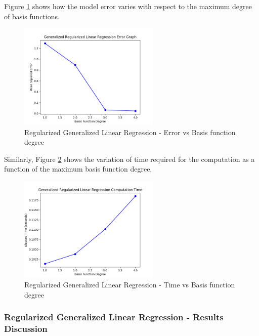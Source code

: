 \documentclass[parskip=full]{scrartcl}
\begin{document}
        Figure \ref{fig:rglg_err_v_deg} shows how the model error varies with respect to the maximum degree of basis functions. 

        \begin{figure}[ht]
            \centering
            \includegraphics[width=0.6\textwidth]{3a_degree_vs_error.png}
            \caption{Regularized Generalized Linear Regression - Error vs Basis function degree}
            \label{fig:rglg_err_v_deg}
        \end{figure}

        Similarly, Figure \ref{fig:rglg_time_v_deg} shows the variation of time required for the computation as a function of the maximum basis function degree. 

        \begin{figure}[ht]
            \centering
            \includegraphics[width=0.6\textwidth]{3a_degree_vs_time.png}
            \caption{Regularized Generalized Linear Regression - Time vs Basis function degree}
            \label{fig:rglg_time_v_deg}
        \end{figure}

        \subsubsection*{Regularized Generalized Linear Regression - Results Discussion} %
        \label{ssub:regularized_generalized_linear_regression_results_discussion}
\end{document}
